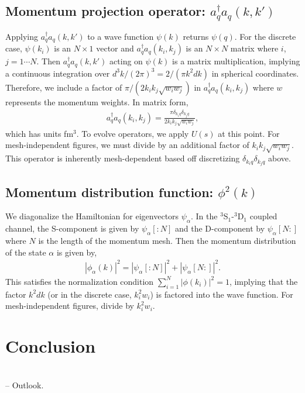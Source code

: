 \documentclass[preprintnumbers,floatfix,aps,prc,preprint,nofootinbib]{revtex4-1}
\begin{document}
\subsection{Momentum projection operator: $a^{\dagger}_q a_q (k, k')$}
\label{sec:momentum_proj_operator}


Applying $a^{\dagger}_q a_q (k, k')$ to a wave function $\psi(k)$ returns $\psi(q)$. For the discrete case, $\psi(k_i)$ is an $N \times 1$ vector and $a^{\dagger}_q a_q (k_i, k_j)$ is an $N \times N$ matrix where $i$, $j=1\cdots N$. Then $a^{\dagger}_q a_q (k, k')$ acting on $\psi(k)$ is a matrix multiplication, implying a continuous integration over $d^3k / (2 \pi)^3 = 2 / (\pi k^2 dk)$ in spherical coordinates. Therefore, we include a factor of $\pi / (2 k_i k_j \sqrt{w_i w_j})$ in $a^{\dagger}_q a_q (k_i, k_j)$ where $w$ represents the momentum weights. In matrix form,
%
\begin{eqnarray}
	\label{eq:momentum_projection_operator}
	a^{\dagger}_q a_q (k_i, k_j) = \frac{\pi \delta_{k_i q} \delta_{k_j q}}{2 k_i k_j \sqrt{w_i w_j}},
\end{eqnarray}
%
which has units fm$^3$. To evolve operators, we apply $U(s)$ at this point. For mesh-independent figures, we must divide by an additional factor of $k_i k_j \sqrt{w_i w_j}$. This operator is inherently mesh-dependent based off discretizing $\delta_{k_i q} \delta_{k_j q}$ above.


\subsection{Momentum distribution function: $\phi^2(k)$}
\label{sec:momentum_dist_funcs}


We diagonalize the Hamiltonian for eigenvectors $\psi_{\alpha}$. In the $^3$S$_1$-$^3$D$_1$ coupled channel, the S-component is given by $\psi_{\alpha}[: \! N]$ and the D-component by $\psi_{\alpha}[N \! :]$ where $N$ is the length of the momentum mesh. Then the momentum distribution of the state $\alpha$ is given by,
%
\begin{eqnarray}
	\label{eq:momentum_distribution}
	|\phi_{\alpha}(k)|^2 = |\psi_{\alpha}[: \! N]|^2 + |\psi_{\alpha}[N \! :]|^2.
\end{eqnarray}
%
This satisfies the normalization condition $\sum_{i=1}^N |\phi(k_i)|^2 = 1$, implying that the factor $k^2 dk$ (or in the discrete case, $k_i^2 w_i$) is factored into the wave function. For mesh-independent figures, divide by $k_i^2 w_i$.


\section{Conclusion}
\label{sec:conclusion}


\\
-- Outlook.





\end{document}

